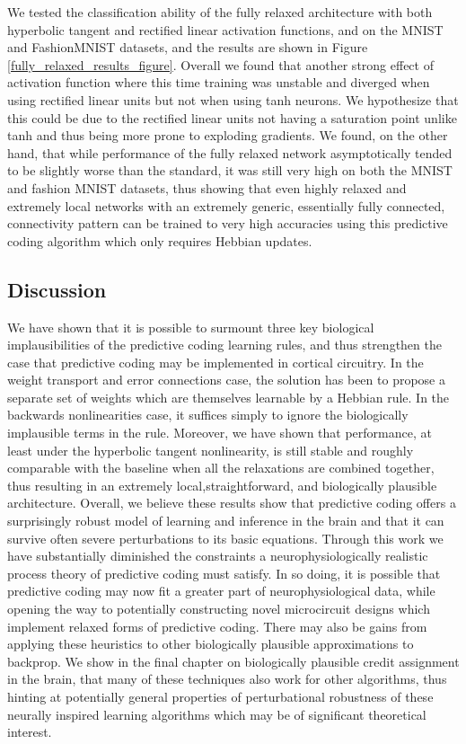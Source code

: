 We tested the classification ability of the fully relaxed architecture with both hyperbolic tangent and rectified linear activation functions, and on the MNIST and FashionMNIST datasets, and the results are shown in Figure \ref{fully_relaxed_results_figure}. Overall we found that another strong effect of activation function where this time training was unstable and diverged when using rectified linear units but not when using tanh neurons. We hypothesize that this could be due to the rectified linear units not having a saturation point unlike tanh and thus being more prone to exploding gradients. We found, on the other hand, that while performance of the fully relaxed network asymptotically tended to be slightly worse than the standard, it was still very high on both the MNIST and fashion MNIST datasets, thus showing that even highly relaxed and extremely local networks with an extremely generic, essentially fully connected, connectivity pattern can be trained to very high accuracies using this predictive coding algorithm which only requires Hebbian updates. 

\subsection{Discussion}

We have shown that it is possible to surmount three key biological implausibilities of the predictive coding learning rules, and thus strengthen the case that predictive coding may be implemented in cortical circuitry. In the weight transport and error connections case, the solution has been to propose a separate set of weights which are themselves learnable by a Hebbian rule. In the backwards nonlinearities case, it suffices simply to ignore the biologically implausible terms in the rule. Moreover, we have shown that performance, at least under the hyperbolic tangent nonlinearity, is still stable and roughly comparable with the baseline when all the relaxations are combined together, thus resulting in an extremely local,straightforward, and biologically plausible architecture. Overall, we believe these results show that predictive coding offers a surprisingly robust model of learning and inference in the brain and that it can survive often severe perturbations to its basic equations. Through this work we have substantially diminished the constraints a neurophysiologically realistic process theory of predictive coding must satisfy. In so doing, it is possible that predictive coding may now fit a greater part of neurophysiological data, while opening the way to potentially constructing novel microcircuit designs which implement relaxed forms of predictive coding.
There may also be gains from applying these heuristics to other biologically plausible approximations to backprop. We show in the final chapter on biologically plausible credit assignment in the brain, that many of these techniques also work for other algorithms, thus hinting at potentially general properties of perturbational robustness of these neurally inspired learning algorithms which may be of significant theoretical interest. 

